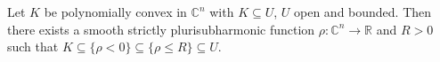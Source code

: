 
Let $K$ be polynomially convex in $\mathbb{C}^n$ with $K \subseteq U$, $U$ open and bounded. Then there exists a smooth strictly plurisubharmonic function $\rho : \mathbb{C}^n \to \mathbb{R}$ and $R > 0$ such that $K \subseteq \{\rho < 0\} \subseteq \{\rho \leq R\} \subseteq U$.
